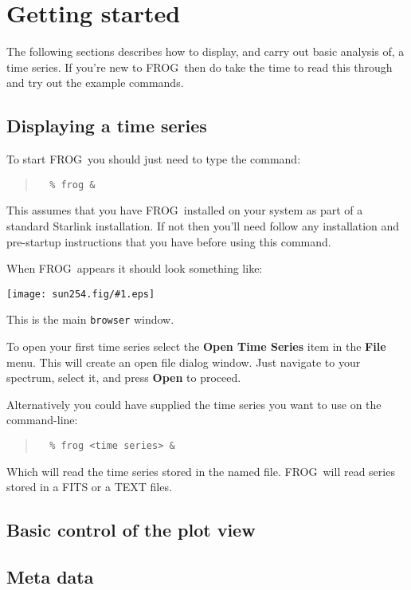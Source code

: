 \documentclass[twoside,11pt]{article}
\newcommand{\htmladdimg}[1]{}
\newcommand{\latexhtml}[2]{#1}
\newcommand{\xlabel}[1]{}
\renewcommand{\_}{\texttt{\symbol{95}}}
\newcommand{\FROG}{\textsf{FROG}}
\newcommand{\mainfigure}[1]
{\begin{center}
 \latexhtml{\texttt{[image: sun254.fig/\#1.eps]}}{\htmladdimg{../sun254.fig/#1.gif}}
 \end{center}
}
\newcommand{\menuitem}[1]{\textbf{#1}}
\newcommand{\hitext}[1]{\texttt{#1}}
\begin{document}
\section{Getting started\xlabel{getting_started}}

The following sections describes how to display, and carry out basic analysis of, a time series. If you're new to \FROG\ then do take the time to read this through and try out the example commands.

\newpage
\subsection{Displaying a time series\xlabel{display_a_time_series}}

To start \FROG\ you should just need to type the command:
\begin{quote}
\begin{verbatim}
  % frog &
\end{verbatim}
\end{quote}
This assumes that you have \FROG\ installed on your system as part of a
standard Starlink installation. If not then you'll need follow any
installation and pre-startup instructions that you have before using
this command.

When \FROG\ appears it should look something like:

\mainfigure{main_window}

This is the main \hitext{browser} window.

To open your first time series select the \menuitem{Open Time Series} item in the \menuitem{File} menu. This will create an  open file dialog window. Just navigate to your spectrum, select it, and press \menuitem{Open} to proceed.

Alternatively you could have supplied the time series you want to use on
the command-line:
\begin{quote}
\begin{verbatim}
  % frog <time series> &
\end{verbatim}
\end{quote}
Which will read the time series stored in the named file. \FROG\ will read
series stored in a FITS or a TEXT files.

\subsection{Basic control of the plot view\xlabel{basic_control}}

\subsection{Meta data\xlabel{meta_data}}
\end{document}
